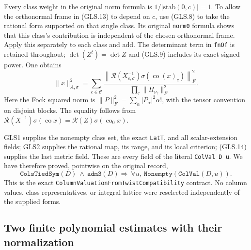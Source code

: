 Every class weight in the original norm formula is
$1/|\mathrm{stab}(0,c)|=1$.  To allow the orthonormal frame in
(GLS.13) to depend on $c$, use (GLS.8) to take the rational form
supported on that single class.  Its original \texttt{norm0} formula
shows that this class's contribution is independent of the chosen
orthonormal frame.  Apply this separately to each class and add.
The determinant term in \texttt{fnOf} is retained throughout;
$\det(Z^t)=\det Z$ and (GLS.9) includes its exact signed power.
One obtains
\[
 \|x\|_{A,\sigma}^{2}
 =\sum_{c\in\mathcal C}
  \frac{\left\|
    \mathcal R(X_{c,\sigma}^{-1})
                \sigma(\operatorname{co}(x)_c)\right\|_F^2}
       {\prod_\tau\|H_{\nu_\tau}\|_F^2}.        \tag{GLS.14}
\]
Here the Fock squared norm is $\|P\|_F^2=\sum_\alpha
|P_\alpha|^2\alpha!$, with the tensor convention on disjoint
blocks.  The equality follows from
$\mathcal R(X^{-1})\sigma(\operatorname{co}x)
=\mathcal R(Z)\sigma(\operatorname{co}_0x)$.

GLS1 supplies the nonempty class set, the exact \texttt{LatT}, and
all scalar-extension fields; GLS2 supplies the rational map, its
range, and its local criterion; (GLS.14) supplies the last metric
field.  These are every field of the literal \texttt{ColVal D u}.
We have therefore proved, pointwise on the original record,
\[
 \texttt{ColsTiedSym}(D)\ \wedge\ \texttt{adm3}(D)
       \Longrightarrow\ \forall u,\
                          \texttt{Nonempty} (\texttt{ColVal}(D,u)).
 \tag{GLS.15}
\]
This is the exact \texttt{ColumnValuationFromTwistCompatibility}
contract.  No column values, class representatives, or integral
lattice were reselected independently of the supplied forms.

\subsection{Two finite polynomial estimates with their normalization}

